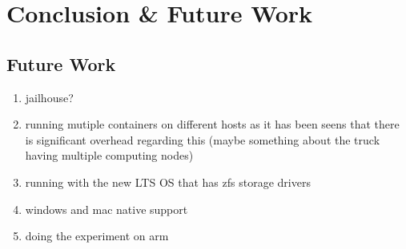 \iffalse  \fi
\chapter{Conclusion \& Future Work}


\section{Future Work}
\begin{enumerate}
\item jailhouse?
\item running mutiple containers on different hosts as it has been seens that there is significant overhead regarding this (maybe something about the truck having multiple computing nodes) %
\item running with the new LTS OS that has zfs storage drivers
\item windows and mac native support 
\item doing the experiment on arm 



\end{enumerate}